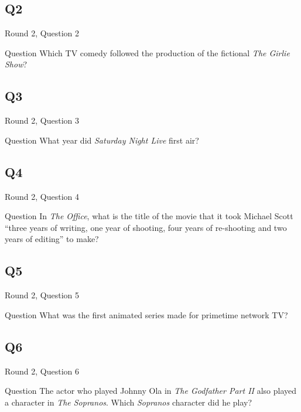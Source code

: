 \documentclass[11pt]{beamer}
\begin{document}
\subsection*{Q2}
\begin{frame}[t]{Round 2, Question 2}
\begin{block}{Question}
Which TV comedy followed the production of the fictional \emph{The Girlie Show}?
\end{block}
\end{frame}
\subsection*{Q3}
\begin{frame}[t]{Round 2, Question 3}
\begin{block}{Question}
What year did \emph{Saturday Night Live} first air?
\end{block}
\end{frame}
\subsection*{Q4}
\begin{frame}[t]{Round 2, Question 4}
\begin{block}{Question}
In \emph{The Office}, what is the title of the movie that it took Michael Scott ``three years of writing, one year of shooting, four years of re-shooting and two years of editing'' to make?
\end{block}
\end{frame}
\subsection*{Q5}
\begin{frame}[t]{Round 2, Question 5}
\begin{block}{Question}
What was the first animated series made for primetime network TV\@?
\end{block}
\end{frame}
\subsection*{Q6}
\begin{frame}[t]{Round 2, Question 6}
\begin{block}{Question}
The actor who played Johnny Ola in \emph{The Godfather Part II} also played a character in \emph{The Sopranos}. Which \emph{Sopranos} character did he play?
\end{block}
\end{frame}
\end{document}
